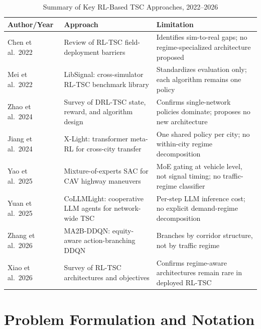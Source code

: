 \documentclass[lettersize,journal]{IEEEtran}
\begin{document}
\begin{table}[!t]
\caption{Summary of Key RL-Based TSC Approaches, 2022--2026\label{tab:related}}
\centering
\renewcommand{\arraystretch}{1.25}
\begin{tabular}{@{}>{\raggedright}p{1.55cm}
                    >{\raggedright}p{1.85cm}
                    >{\raggedright\arraybackslash}p{3.35cm}@{}}
\toprule
\textbf{Author/Year} & \textbf{Approach} & \textbf{Limitation} \\
\midrule
Chen et al.\ 2022~\cite{chen2022realdeal}
  & Review of RL-TSC field-deployment barriers
  & Identifies sim-to-real gaps; no regime-specialized architecture proposed \\
Mei et al.\ 2022~\cite{mei2023libsignal}
  & LibSignal: cross-simulator RL-TSC benchmark library
  & Standardizes evaluation only; each algorithm remains one policy \\
Zhao et al.\ 2024~\cite{zhao2024survey}
  & Survey of DRL-TSC state, reward, and algorithm design
  & Confirms single-network policies dominate; proposes no new architecture \\
Jiang et al.\ 2024~\cite{jiang2024xlight}
  & X-Light: transformer meta-RL for cross-city transfer
  & One shared policy per city; no within-city regime decomposition \\
Yao et al.\ 2025~\cite{yao2025moesac}
  & Mixture-of-experts SAC for CAV highway maneuvers
  & MoE gating at vehicle level, not signal timing; no traffic-regime classifier \\
Yuan et al.\ 2025~\cite{yuan2025collmlight}
  & CoLLMLight: cooperative LLM agents for network-wide TSC
  & Per-step LLM inference cost; no explicit demand-regime decomposition \\
Zhang et al.\ 2026~\cite{zhang2026equity}
  & MA2B-DDQN: equity-aware action-branching DDQN
  & Branches by corridor structure, not by traffic regime \\
Xiao et al.\ 2026~\cite{xiao2026survey}
  & Survey of RL-TSC architectures and objectives
  & Confirms regime-aware architectures remain rare in deployed RL-TSC \\
\bottomrule
\end{tabular}
\end{table}

\section{Problem Formulation and Notation}
\label{sec:arch}
\end{document}
